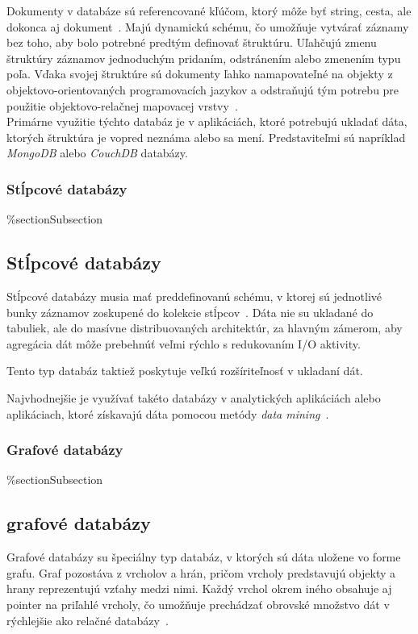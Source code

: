 Dokumenty v databáze sú referencované kľúčom, ktorý môže byť string, cesta, ale dokonca aj dokument~\cite{NoSQLDBvsRealtionDB}. Majú dynamickú schému, čo umožňuje vytvárať záznamy bez toho, aby bolo potrebné predtým definovať štruktúru. Uľahčujú zmenu štruktúry záznamov jednoduchým pridaním, odstránením alebo zmenením typu poľa. Vďaka svojej štruktúre sú dokumenty ľahko namapovateľné na objekty z objektovo-orientovaných programovacích jazykov a odstraňujú tým potrebu pre použitie objektovo-relačnej mapovacej vrstvy~\cite{MongoDBvsMySQLCompared}.
\\

Primárne využitie týchto databáz je v aplikáciách, ktoré potrebujú ukladať dáta, ktorých štruktúra je vopred neznáma alebo sa mení. Predstaviteľmi sú napríklad \textit{MongoDB} alebo \textit{CouchDB} databázy.

%
%
{
	\subsubsection{Stĺpcové databázy}
}
{
	\%section{Subsection}
	\subsection{Stĺpcové databázy}
}
\label{subsubsection:column_db}
Stĺpcové databázy musia mať preddefinovanú schému, v ktorej sú jednotlivé bunky záznamov zoskupené do kolekcie stĺpcov~\cite{MongoDBvsMySQL2015}. Dáta nie su ukladané do tabuliek, ale do masívne distribuovaných architektúr, za hlavným zámerom, aby agregácia dát môže prebehnúť veľmi rýchlo s redukovaním I/O aktivity.

Tento typ databáz taktiež poskytuje veľkú rozšíriteľnosť v ukladaní dát.

Najvhodnejšie je využívať takéto databázy v analytických aplikáciách alebo aplikáciach, ktoré získavajú dáta pomocou metódy \textit{data mining}~\cite{NoSQLDBvsRealtionDB}.

%
%
{
	\subsubsection{Grafové databázy}
}
{
	\%section{Subsection}
	\subsection{grafové databázy}
}
\label{subsubsection:graph_db}
Grafové databázy su špeciálny typ databáz, v ktorých sú dáta uložene vo forme grafu. Graf pozostáva z vrcholov a hrán, pričom vrcholy predstavujú objekty a hrany reprezentujú vzťahy medzi nimi. Každý vrchol okrem iného obsahuje aj pointer na priľahlé vrcholy, čo umožňuje prechádzať obrovské množstvo dát v rýchlejšie ako relačné databázy~\cite{NoSQLDBvsRealtionDB}.

